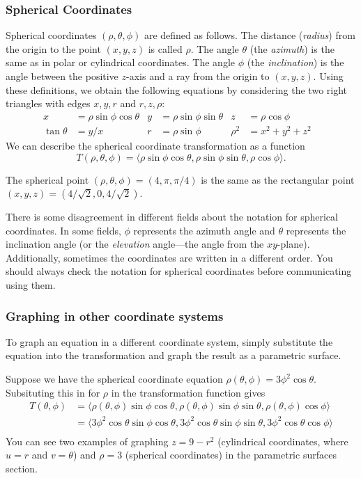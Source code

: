 \subsubsection{Spherical Coordinates}
Spherical coordinates $(\rho,\theta,\phi)$ are defined as follows.
The distance (\emph{radius}) from the origin to the point $(x,y,z)$ is
called $\rho$. The angle $\theta$ (the \emph{azimuth}) is the same as
in polar or cylindrical coordinates. The angle $\phi$ (the
\emph{inclination}) is the angle between the positive $z$-axis and a
ray from the origin to $(x,y,z)$. Using these definitions, we obtain
the following equations by considering the two right triangles with
edges $x,y,r$ and $r,z,\rho$:
\begin{align*}
  x&=\rho\sin\phi\cos\theta  &
  y&=\rho\sin\phi\sin\theta & 
  z&=\rho\cos\phi\\
  \tan\theta&=y/x &
  r&=\rho\sin\phi & 
  \rho^2&=x^2+y^2+z^2 &
\end{align*}
We can describe the spherical coordinate transformation as a
function 
$$T(\rho,\theta,\phi) = \langle\rho\sin\phi\cos\theta,\rho\sin\phi\sin\theta,\rho\cos\phi\rangle.$$ 

\examplebegin 
The spherical point {$(\rho, \theta, \phi)=(4,\pi,\pi/4)$} is the same
as the rectangular point $(x,y,z) = (4/\sqrt{2},0,4/\sqrt{2})$.
\exampleend

There is some disagreement in different fields about the notation for
spherical coordinates.  In some fields, $\phi$ represents the azimuth
angle and $\theta$ represents the inclination angle (or the
\emph{elevation} angle---the angle from the $xy$-plane).
Additionally, sometimes the coordinates are written in a different
order.  You should always check the notation for spherical coordinates
before communicating using them.

\subsubsection{Graphing in other coordinate systems}
To graph an equation in a different coordinate system, simply substitute the equation into the transformation and graph the result as a parametric surface.  

\examplebegin
Suppose we have the spherical coordinate equation $\rho(\theta,\phi)=3\phi^2\cos\theta$.  Subsituting this in for $\rho$ in the transformation function gives 
\begin{align*}
T(\theta,\phi) &= \langle\rho(\theta,\phi)\sin\phi\cos\theta, \rho(\theta,\phi)\sin\phi\sin\theta, \rho(\theta,\phi)\cos\phi\rangle\\
&=\langle3\phi^2\cos\theta\sin\phi\cos\theta, 3\phi^2\cos\theta\sin\phi\sin\theta, 3\phi^2\cos\theta\cos\phi\rangle\\
\end{align*}
You can see two examples of graphing $z=9-r^2$ (cylindrical
coordinates, where $u=r$ and $v=\theta$) and $\rho=3$ (spherical
coordinates) in the parametric surfaces section.


